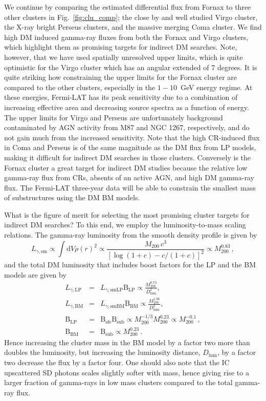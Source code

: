 \documentclass[10pt,aps,pra,reprint,amsmath,amsfonts,amssymb,showpacs,nofootinbib,floatfix]{revtex4-1}
\newcommand{\rmn}{\mathrm}
\newcommand{\sfe}{\rmn{sfe}}
\newcommand{\sub}{\rmn{sub}}
\newcommand{\B}{\rmn{B}}
\newcommand{\sm}{\rmn{sm}}
\newcommand{\dd}{\rmn{d}}
\newcommand{\mvir}{M_{200}}
\begin{document}
We continue by comparing the estimated differential flux from Fornax
to three other clusters in Fig.~\ref{fig:clu_comp}; the close by and
well studied Virgo cluster, the X-ray bright Perseus clusters, and the
massive merging Coma cluster. We find high DM induced gamma-ray fluxes
from both the Fornax and Virgo clusters, which highlight them as
promising targets for indirect DM searches. Note, however, that we
have used spatially unresolved upper limits, which is quite optimistic
for the Virgo cluster which has an angular extended of 7 degrees. It
is quite striking how constraining the upper limits for the Fornax
cluster are compared to the other clusters, especially in the
$1-10$~GeV energy regime. At these energies, Fermi-LAT has its peak
sensitivity due to a combination of increasing effective area and
decreasing source spectra as a function of energy. The upper limits
for Virgo and Perseus are unfortunately background contaminated by AGN
activity from M87 and NGC 1267, respectively, and do not gain much
from the increased sensitivity. Note that the high CR-induced flux in
Coma and Perseus is of the same magnitude as the DM flux from LP
models, making it difficult for indirect DM searches in those
clusters. Conversely is the Fornax cluster a great target for indirect
DM studies because the relative low gamma-ray flux from CRs, absents
of an active AGN, and high DM gamma-ray flux. The Fermi-LAT three-year
data will be able to constrain the smallest mass of substructures
using the DM BM models. 

What is the figure of merit for selecting the most promising cluster
targets for indirect DM searches? To this end, we employ the
luminosity-to-mass scaling relations. The gamma-ray luminosity from
the smooth density profile is given by \cite{2009PhRvL.103r1302P}
\begin{equation}
L_{\gamma,\sm} \propto \int \dd V \rho(r)^2 \propto \frac{M_{200}\,c^3}
{\left[\log\left(1+c\right)-c/(1+c)\right]^2} \propto \mvir^{0.83}\,,
\end{equation}
and the total DM luminosity that includes boost factors for the LP and
the BM models are given by
\begin{eqnarray}
\label{eq:LP_scaling}
L_{\gamma,\rmn{LP}} &=& L_{\gamma,\rmn{smLP}} \B_\rmn{LP} \propto \frac{\mvir^{0.73}}{D_\rmn{lum}^2},\\
\label{eq:BM_scaling}
L_{\gamma,\rmn{BM}} &=& L_{\gamma,\rmn{smBM}} \B_\rmn{BM} \propto  \frac{\mvir^{1.06}}{D_\rmn{lum}^2},\\
\B_\rmn{LP}&=&\B_\sfe \B_\sub \propto \mvir^{-1/3}\mvir^{0.23} \propto
 \mvir^{-0.1}\,,\\
\B_\rmn{BM}&=&\B_\sub \propto \mvir^{0.23}\,.
\end{eqnarray}
Hence increasing the cluster mass in the BM model by a factor two more
than doubles the luminosity, but increasing the luminosity distance,
$D_\rmn{lum}$, by a factor two decrease the flux by a factor four. One
should also note that the IC upscattered SD photons scales slightly
softer with mass, hence giving rise to a larger fraction of gamma-rays
in low mass clusters compared to the total gamma-ray flux.
\end{document}
